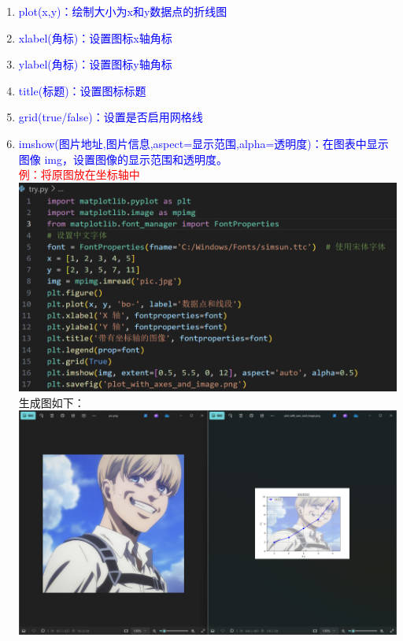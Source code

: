 \documentclass[12pt,a4paper,UTF8]{article}
\begin{document}
\begin{enumerate}
        \item \textcolor{blue}{plot(x,y)：绘制大小为x和y数据点的折线图}\\
        \item \textcolor{blue}{xlabel(角标)：设置图标x轴角标}\\
        \item \textcolor{blue}{ylabel(角标)：设置图标y轴角标}\\
        \item \textcolor{blue}{title(标题)：设置图标标题}\\
        \item \textcolor{blue}{grid(true/false)：设置是否启用网格线}\\
        \item \textcolor{blue}{imshow(图片地址,图片信息,aspect=显示范围,alpha=透明度)：在图表中显示图像 img，设置图像的显示范围和透明度。}\\
        \textcolor{red}{例：将原图放在坐标轴中}\\
        \includegraphics[scale=0.25]{pictures/16.png}\\
        生成图如下：\\
        \includegraphics[scale=0.15]{pictures/16_2.png}\\

\end{enumerate}
\end{document}
